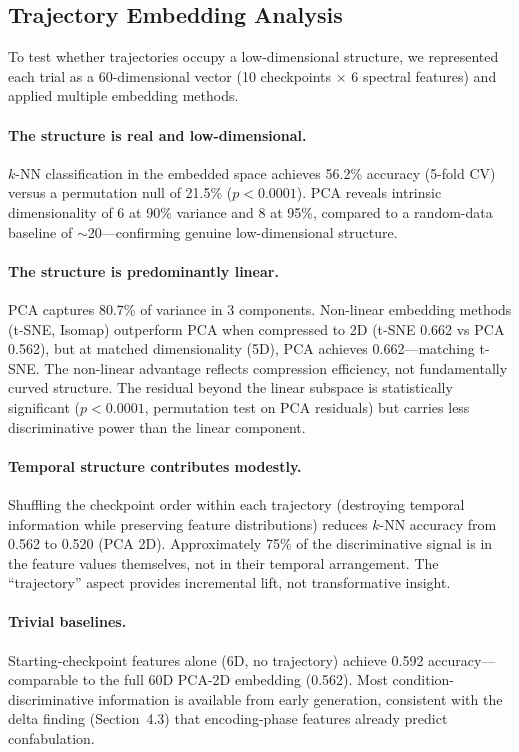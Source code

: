 \documentclass[11pt,a4paper]{article}
\begin{document}
\subsection{Trajectory Embedding Analysis}

To test whether trajectories occupy a low-dimensional structure, we
represented each trial as a 60-dimensional vector (10 checkpoints
$\times$ 6 spectral features) and applied multiple embedding methods.

\paragraph{The structure is real and low-dimensional.}
$k$-NN classification in the embedded space achieves 56.2\% accuracy
(5-fold CV) versus a permutation null of 21.5\% ($p < 0.0001$). PCA
reveals intrinsic dimensionality of 6 at 90\% variance and 8 at 95\%,
compared to a random-data baseline of $\sim$20---confirming genuine
low-dimensional structure.

\paragraph{The structure is predominantly linear.}
PCA captures 80.7\% of variance in 3 components. Non-linear embedding
methods (t-SNE, Isomap) outperform PCA when compressed to 2D (t-SNE
0.662 vs PCA 0.562), but at matched dimensionality (5D), PCA achieves
0.662---matching t-SNE. The non-linear advantage reflects compression
efficiency, not fundamentally curved structure. The residual beyond
the linear subspace is statistically significant ($p < 0.0001$,
permutation test on PCA residuals) but carries less discriminative
power than the linear component.

\paragraph{Temporal structure contributes modestly.}
Shuffling the checkpoint order within each trajectory (destroying
temporal information while preserving feature distributions) reduces
$k$-NN accuracy from 0.562 to 0.520 (PCA 2D). Approximately 75\% of
the discriminative signal is in the feature values themselves, not in
their temporal arrangement. The ``trajectory'' aspect provides
incremental lift, not transformative insight.

\paragraph{Trivial baselines.}
Starting-checkpoint features alone (6D, no trajectory) achieve 0.592
accuracy---comparable to the full 60D PCA-2D embedding (0.562). Most
condition-discriminative information is available from early
generation, consistent with the delta finding (Section~4.3) that
encoding-phase features already predict confabulation.
\end{document}
